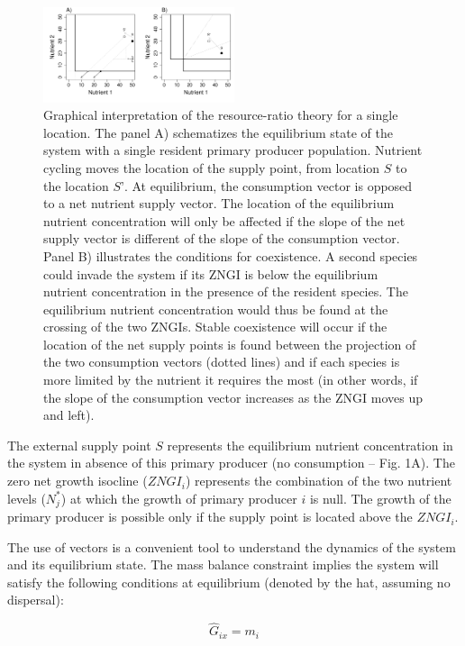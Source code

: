 \documentclass[letterpaper,twocolumn,showkeys]{revtex4-1}
\begin{document}
\begin{figure}[tb!]
   \centering
   \includegraphics[width=0.5\textwidth]{R-Ratio_theory.pdf}
   \caption{Graphical interpretation of the resource-ratio theory for a single location. The panel A) schematizes the equilibrium state of the system with a single resident primary producer population. Nutrient cycling moves the location of the supply point, from location $S$ to the location $S’$. At equilibrium, the consumption vector is opposed to a net nutrient supply vector. The location of the equilibrium nutrient concentration will only be affected if the slope of the net supply vector is different of the slope of the consumption vector. Panel B) illustrates the conditions for coexistence. A second species could invade the system if its ZNGI is below the equilibrium nutrient concentration in the presence of the resident species. The equilibrium nutrient concentration would thus be found at the crossing of the two ZNGIs. Stable coexistence will occur if the location of the net supply points is found between the projection of the two consumption vectors (dotted lines) and if each species is more limited by the nutrient it requires the most (in other words, if the slope of the consumption vector increases as the ZNGI moves up and left).}
   \label{f:R-Ratio_theory}
\end{figure}

The external supply point $S$ represents the equilibrium nutrient concentration in the system in absence of this primary producer (no consumption – Fig. 1A). The zero net growth isocline ($ZNGI_i$) represents the combination of the two nutrient levels ($N_{j}^*$) at which the growth of primary producer $i$ is null. The growth of the primary producer is possible only if the supply point is located above the $ZNGI_i$. 

The use of vectors is a convenient tool to understand the dynamics of the system and its equilibrium state. The mass balance constraint implies the system will satisfy the following conditions at equilibrium (denoted by the hat, assuming no dispersal):

\begin{equation}
	\label{e:bnet}
	\widehat{G} _{ix}= m_{i} 
\end{equation}
\end{document}
